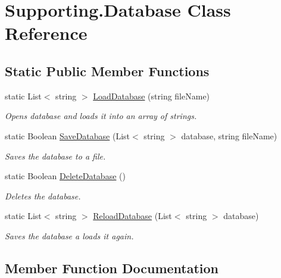 \hypertarget{class_supporting_1_1_database}{}\section{Supporting.\+Database Class Reference}
\label{class_supporting_1_1_database}
\subsection*{Static Public Member Functions}
\begin{DoxyCompactItemize}
\item 
static List$<$ string $>$ \hyperlink{class_supporting_1_1_database_a56638e942ca800b44a7f1787aebc8903}{Load\+Database} (string file\+Name)
\begin{DoxyCompactList}\small\item\em Opens database and loads it into an array of strings. \end{DoxyCompactList}\item 
static Boolean \hyperlink{class_supporting_1_1_database_a9766e0a3c4f804172213ebc10d236ee6}{Save\+Database} (List$<$ string $>$ database, string file\+Name)
\begin{DoxyCompactList}\small\item\em Saves the database to a file. \end{DoxyCompactList}\item 
static Boolean \hyperlink{class_supporting_1_1_database_a67a77f2b43b55e5400d0b7df70433ef9}{Delete\+Database} ()
\begin{DoxyCompactList}\small\item\em Deletes the database. \end{DoxyCompactList}\item 
static List$<$ string $>$ \hyperlink{class_supporting_1_1_database_a617e9c18427061b85a67af0cd9ba9e32}{Reload\+Database} (List$<$ string $>$ database)
\begin{DoxyCompactList}\small\item\em Saves the database a loads it again. \end{DoxyCompactList}\end{DoxyCompactItemize}


\subsection{Member Function Documentation}
\hypertarget{class_supporting_1_1_database_a67a77f2b43b55e5400d0b7df70433ef9}{}
